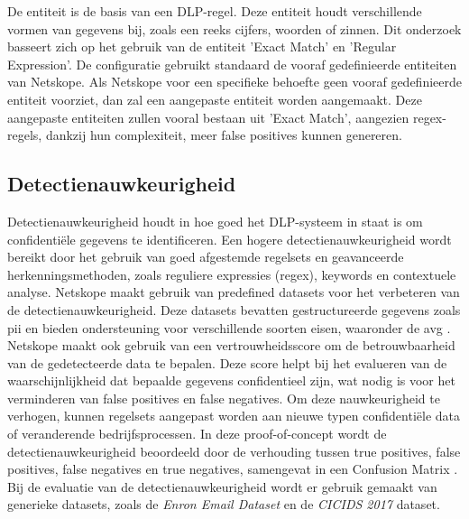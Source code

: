 De entiteit is de basis van een DLP-regel. 
Deze entiteit houdt verschillende vormen van gegevens bij, zoals een reeks cijfers, woorden of zinnen. 
Dit onderzoek basseert zich op het gebruik van de entiteit 'Exact Match' en 'Regular Expression'. 
De configuratie gebruikt standaard de vooraf gedefinieerde entiteiten van Netskope. 
Als Netskope voor een specifieke behoefte geen vooraf gedefinieerde entiteit voorziet, dan zal een aangepaste entiteit worden aangemaakt.
Deze aangepaste entiteiten zullen vooral bestaan uit 'Exact Match', aangezien regex-regels, dankzij hun complexiteit, meer false positives kunnen genereren.


\subsection{Detectienauwkeurigheid}
\label{sec:detectienauwkeurigheid-literatuurstudie}

Detectienauwkeurigheid houdt in hoe goed het DLP-systeem in staat is om confidentiële gegevens te identificeren. 
Een hogere detectienauwkeurigheid wordt bereikt door het gebruik van goed afgestemde regelsets en geavanceerde herkenningsmethoden, zoals reguliere expressies (regex), keywords en contextuele analyse.
Netskope maakt gebruik van predefined datasets voor het verbeteren van de detectienauwkeurigheid. 
Deze datasets bevatten gestructureerde gegevens zoals \gls{pii} en bieden ondersteuning voor verschillende soorten eisen, waaronder de \gls{avg} \autocite{Clementelli2023}. 
Netskope maakt ook gebruik van een vertrouwheidsscore om de betrouwbaarheid van de gedetecteerde data te bepalen. 
Deze score helpt bij het evalueren van de waarschijnlijkheid dat bepaalde gegevens confidentieel zijn, 
wat nodig is voor het verminderen van false positives en false negatives. 
Om deze nauwkeurigheid te verhogen, kunnen regelsets aangepast worden aan nieuwe typen confidentiële data of veranderende bedrijfsprocessen.
In deze proof-of-concept wordt de detectienauwkeurigheid beoordeeld door de verhouding tussen true positives, false positives, 
false negatives en true negatives, samengevat in een Confusion Matrix \autocite{Microsoftn.d.}.
Bij de evaluatie van de detectienauwkeurigheid wordt er gebruik gemaakt van generieke datasets, zoals de \textit{Enron Email Dataset} en de \textit{CICIDS 2017} dataset.

